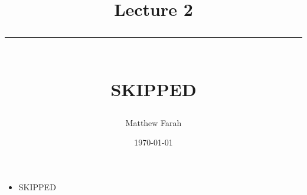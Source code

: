 \documentclass{article}
\date{
	\vspace{-.75em}
	{\large \today}
}
\title{
	\vspace*{-1.5em}
	{\Huge Lecture 2} \\
	\vspace{-1em}
	\rule{\textwidth/4}{.01em} \\
	\vspace{-.25em}
	{\Large SKIPPED}
	\vspace{-.75em}
}
\author{
	{\large Matthew Farah}
}
\begin{document}
\maketitle
\pagestyle{fancy}

\fi

\begin{itemize}
	\item SKIPPED
\end{itemize}

\ifdefined\iscombined
	\newpage
\else
	
\end{document}
